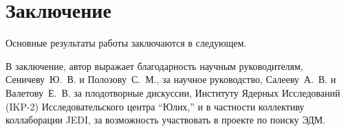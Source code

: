 \chapter*{Заключение}                       %


Основные результаты работы заключаются в следующем.


В заключение, автор выражает благодарность научным руководителям, Сеничеву~Ю.~В. и Полозову~С.~М., за научное руководство, Салееву~А.~В. и Валетову~Е.~В. за плодотворные дискуссии, Институту Ядерных Исследований (IKP-2) Исследовательского центра ``Юлих,'' и в частности коллективу коллаборации JEDI, за возможность участвовать в проекте по поиску ЭДМ.
